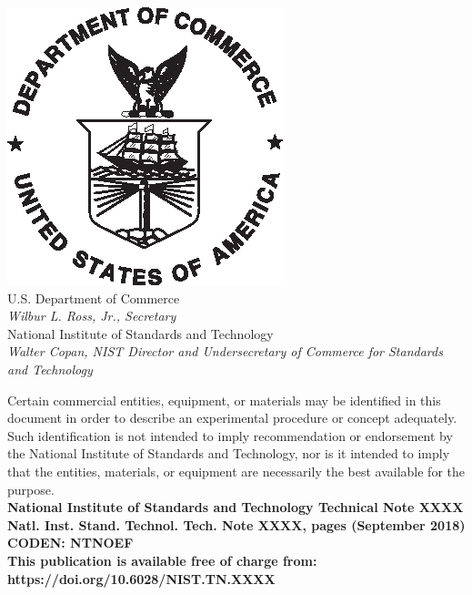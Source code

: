 \documentclass[12pt]{article}
\newcommand{\pubnumber}{XXXX}
\newcommand{\DOI}{https://doi.org/10.6028/NIST.TN.XXXX}
\newcommand{\monthyear}{September 2018}
\begin{document}
\begin{titlepage}
\begin{flushright}
\includegraphics[width=0.18\linewidth]{DoC-logo.eps}\\
\vfill
\footnotesize U.S. Department of Commerce\\
\textit{Wilbur L. Ross, Jr., Secretary}\\
\vspace{10pt}
National Institute of Standards and Technology\\
\textit{Walter Copan, NIST Director and Undersecretary of Commerce for Standards and Technology}
\end{flushright}
\end{titlepage}

\begin{titlepage}
\begin{flushright}
\footnotesize  Certain commercial entities, equipment, or materials may be identified in this document in order to describe an experimental procedure or concept adequately. Such identification is not intended to imply recommendation or endorsement by the National Institute of Standards and Technology, nor is it intended to imply that the entities, materials, or equipment are necessarily the best available for the purpose.\\
\vfill
\normalsize \textbf{National Institute of Standards and Technology Technical Note \pubnumber\\
Natl. Inst. Stand. Technol. Tech. Note \pubnumber, \pageref{LastPage} pages (\monthyear)} \\
\textbf{CODEN: NTNOEF}\\
\vspace{12pt}
\textbf{This publication is available free of charge from: \DOI}
\vfill
\end{flushright}
\end{titlepage}
\end{document}
